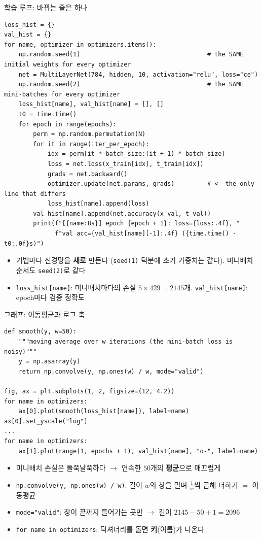 \documentclass[aspectratio=169,11pt]{beamer}
\newcommand{\codesmall}{\ttfamily\fontsize{7.4}{8.3}\selectfont}
\newcommand{\codetiny}{\ttfamily\fontsize{6.8}{7.6}\selectfont}
\newcommand{\code}[1]{\texttt{#1}}
\begin{document}
\begin{frame}{학습 루프: 바뀌는 줄은 하나}
\footnotesize
\begin{lstlisting}[basicstyle=\codetiny]
loss_hist = {}
val_hist = {}
for name, optimizer in optimizers.items():
    np.random.seed(1)                                   # the SAME initial weights for every optimizer
    net = MultiLayerNet(784, hidden, 10, activation="relu", loss="ce")
    np.random.seed(2)                                   # the SAME mini-batches for every optimizer
    loss_hist[name], val_hist[name] = [], []
    t0 = time.time()
    for epoch in range(epochs):
        perm = np.random.permutation(N)
        for it in range(iter_per_epoch):
            idx = perm[it * batch_size:(it + 1) * batch_size]
            loss = net.loss(x_train[idx], t_train[idx])
            grads = net.backward()
            optimizer.update(net.params, grads)         # <- the only line that differs
            loss_hist[name].append(loss)
        val_hist[name].append(net.accuracy(x_val, t_val))
        print(f"[{name:8s}] epoch {epoch + 1}: loss={loss:.4f}, "
              f"val acc={val_hist[name][-1]:.4f} ({time.time() - t0:.0f}s)")
\end{lstlisting}
\small
\begin{itemize}
\item 기법마다 신경망을 \textbf{새로} 만든다 (\code{seed(1)} 덕분에 초기 가중치는 같다). 미니배치 순서도 \code{seed(2)}로 같다
\item \code{loss\_hist[name]}: 미니배치마다의 손실 $5\times429=2145$개. \code{val\_hist[name]}: epoch마다 검증 정확도
\end{itemize}
\end{frame}

\begin{frame}[fragile]{그래프: 이동평균과 로그 축}
\begin{lstlisting}[basicstyle=\codesmall]
def smooth(y, w=50):
    """moving average over w iterations (the mini-batch loss is noisy)"""
    y = np.asarray(y)
    return np.convolve(y, np.ones(w) / w, mode="valid")

fig, ax = plt.subplots(1, 2, figsize=(12, 4.2))
for name in optimizers:
    ax[0].plot(smooth(loss_hist[name]), label=name)
ax[0].set_yscale("log")
...
for name in optimizers:
    ax[1].plot(range(1, epochs + 1), val_hist[name], "o-", label=name)
\end{lstlisting}
\small
\begin{itemize}
\item 미니배치 손실은 들쭉날쭉하다 $\to$ 연속한 $50$개의 \textbf{평균}으로 매끄럽게
\item \code{np.convolve(y, np.ones(w) / w)}: 길이 $w$의 창을 밀며 $\frac1w$씩 곱해 더하기 $=$ 이동평균
\item \code{mode="valid"}: 창이 끝까지 들어가는 곳만 $\to$ 길이 $2145-50+1=2096$
\item \code{for name in optimizers}: 딕셔너리를 돌면 \textbf{키}(이름)가 나온다
\end{itemize}
\end{frame}
\end{document}
